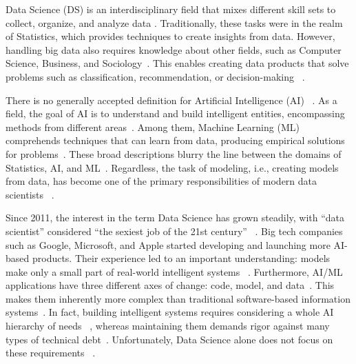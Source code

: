 Data Science (DS) is an interdisciplinary field that mixes different skill
sets to collect, organize, and analyze data \parencite{Hayashi1998WhatExample}.
Traditionally, these tasks were in the realm of Statistics, which provides
techniques to create insights from data. However, handling big data also
requires knowledge about other fields, such as Computer Science, Business,
and Sociology~\parencite{Cao2018DataScience,Dhar2013DataPrediction}.
This enables creating data products that solve problems such as
classification, recommendation, or decision-making%
~\parencite{Cao2018DataScience,Lakshmanan2020MachinePatterns}.

There is no generally accepted definition for Artificial Intelligence (AI)%
~\parencite{Emmert-Streib2020ArtificialStatus}. As a field, the goal of AI
is to understand and build intelligent entities, encompassing methods
from different areas~\parencite{RussellS2021Artificial4th}. Among them,
Machine Learning (ML) comprehends techniques that can learn from data,
producing empirical solutions for problems~\parencite{Abu-Mostafa2012LearningData}.
These broad descriptions blurry the line between the domains of Statistics,
AI, and ML~\parencite{Emmert-Streib2020ArtificialStatus}. Regardless,
the task of modeling, i.e., creating models from data, has become
one of the primary responsibilities of modern data scientists%
~\mbox{\parencite{Burkov2020MachineEngineering,Kim2016TheTeams,
Lakshmanan2020MachinePatterns}}.

Since 2011, the interest in the term Data Science has grown steadily,
with ``data scientist'' considered ``the sexiest job of the 21st century''%
~\parencite{Cao2018DataScience,Davenport2012DataCentury}. Big tech companies
such as Google, Microsoft, and Apple started developing and launching more
AI-based products. Their experience led to an important understanding:
models make only a small part of real-world intelligent systems%
~\mbox{\parencite{Hulten2018BuildingSystems,Sculley2015HiddenSystems}}.
Furthermore, AI/ML applications have three different axes of change:
code, model, and data~\parencite{Sato2019ContinuousLearning}.
This makes them inherently more complex than traditional software-based
information systems~\parencite{Amershi2019SoftwareStudy}. In fact, building
intelligent systems requires considering a whole AI hierarchy of needs%
~\parencite{Rogati2017TheNeeds}, whereas maintaining them demands rigor
against many types of technical debt~\parencite{Sculley2015HiddenSystems}.
Unfortunately, Data Science alone does not focus on these requirements%
~\parencite{Burkov2020MachineEngineering,Makinen2021WhoHelp,Menzies2020TheAI,
Sato2019ContinuousLearning}.

